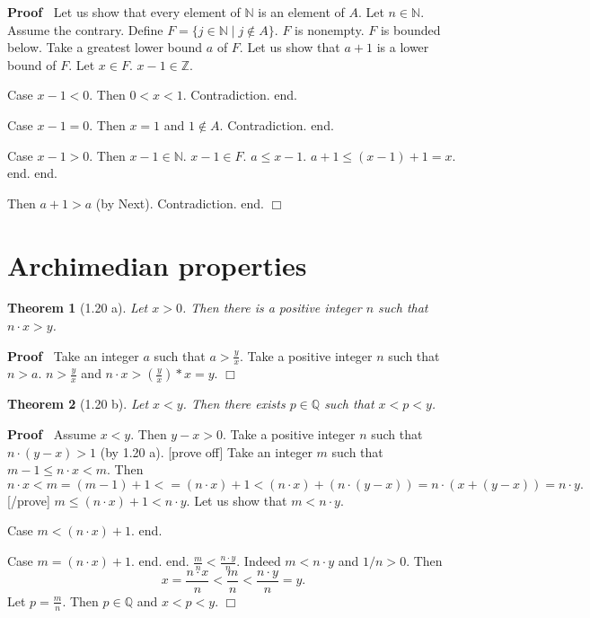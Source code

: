 \documentclass{article}
\newenvironment{proof}{\noindent\textbf{Proof\ }}{\hspace*{\fill}$\Box$\medskip}
\newtheorem{theorem}{Theorem}
\begin{document}
\begin{proof}
Let us show that every element of $\mathbb{N}$ is an element of $A$. 
	Let $n \in \mathbb{N}$.
	Assume the contrary.
	Define $F = \{ j \in \mathbb{N} \mid j \notin A\}$.
	$F$ is nonempty. $F$ is bounded below.
  Take a greatest lower bound $a$ of $F$.
	Let us show that $a+1$ is a lower bound of $F$.
		Let $x \in F$. $x - 1 \in \mathbb{Z}$.
		
		Case $x - 1 < 0$. Then $0 < x < 1$. Contradiction. end.

		Case $x - 1 = 0$. Then $x = 1$ and $1 \notin A$. Contradiction. end.
		
		Case $x - 1 > 0$. Then $x - 1 \in \mathbb{N}$. $x - 1 \in F$.
			$a \leq x - 1$.
			$a + 1 \leq (x - 1) + 1 = x$.
			end.
	end.
	
	Then $a+1 > a$ (by Next).
	Contradiction.
end.
\end{proof}

\section{Archimedian properties}

\begin{theorem}[1.20 a] Let $x > 0$. Then there is a 
positive integer $n$ such that $n \cdot x > y$. \end{theorem}

\begin{proof} Take an integer $a$ such that $a > \frac{y}{x}$.
Take a positive integer $n$ such that $n > a$.
$n > \frac{y}{x}$ and $n \cdot x > (\frac{y}{x})*x = y$.
\end{proof}


\begin{theorem}[1.20 b] Let $x < y$. Then there exists 
$p \in \mathbb{Q}$ such that $x < p < y$. \end{theorem}
\begin{proof} Assume $x < y$. Then $y - x > 0$.
Take a positive integer $n$ such that 
$n\cdot (y-x) > 1$ (by 1.20 a).
[prove off]
Take an integer $m$ such that
$m -1 \leq n \cdot x < m$.
Then
$$n \cdot x < m = (m - 1) + 1 <= (n\cdot x) + 1 < 
(n\cdot x) + (n\cdot (y-x)) = n \cdot (x + (y - x)) = n \cdot y.$$
[/prove]
$m \leq (n\cdot x) + 1 < n \cdot y$.
Let us show that $m < n\cdot y$.

Case $m < (n\cdot x) + 1$. end.

Case $m = (n\cdot x) + 1$. end.
end.
$\frac{m}{n} < \frac{n\cdot y}{n}$. Indeed $m < n\cdot y$ and $1/n > 0$.
Then
$$x = \frac{n\cdot x}{n} < \frac{m}{n} < \frac{n\cdot y}{n} = y.$$
Let $p = \frac{m}{n}$. Then $p \in \mathbb{Q}$ and $x < p < y$.
\end{proof}
\end{document}
